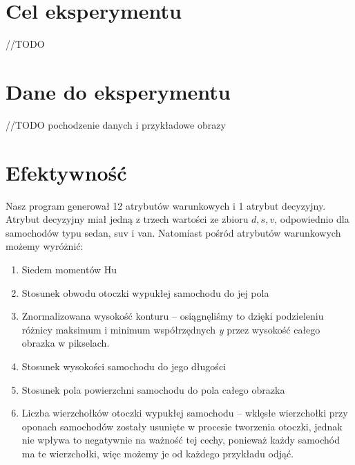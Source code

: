 \documentclass{article}
\begin{document}
\section{Cel eksperymentu}
//TODO
\section{Dane do eksperymentu}
//TODO pochodzenie danych i przykładowe obrazy
\section{Efektywność}
Nasz program generował 12 atrybutów warunkowych i 1 atrybut decyzyjny. Atrybut decyzyjny miał jedną z trzech wartości ze zbioru ${d, s, v}$, odpowiednio dla samochodów typu sedan, suv i van. Natomiast pośród atrybutów warunkowych możemy wyróżnić:
\begin{enumerate}
\item Siedem momentów Hu
\item Stosunek obwodu otoczki wypukłej samochodu do jej pola
\item Znormalizowana wysokość konturu -- osiągnęliśmy to dzięki podzieleniu różnicy maksimum i minimum współrzędnych \textit{y} przez wysokość całego obrazka w pikselach.
\item Stosunek wysokości samochodu do jego długości
\item Stosunek pola powierzchni samochodu do pola całego obrazka
\item Liczba wierzchołków otoczki wypukłej samochodu -- wklęsłe wierzchołki przy oponach samochodów zostały usunięte w procesie tworzenia otoczki, jednak nie wpływa to negatywnie na ważność tej cechy, ponieważ każdy samochód ma te wierzchołki, więc możemy je od każdego przykładu odjąć.
\end{enumerate}
\end{document}
